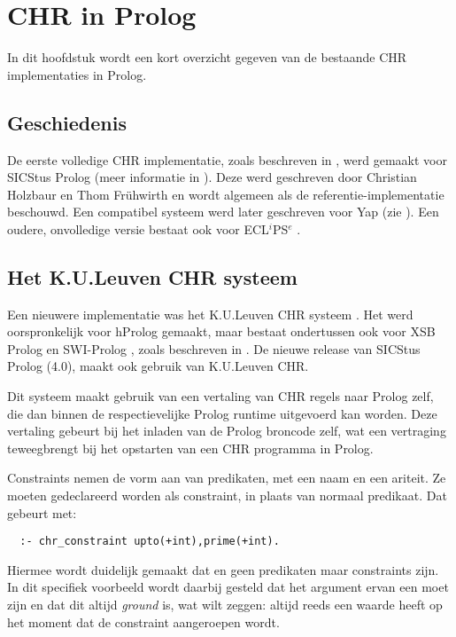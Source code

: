 \chapter{CHR in Prolog} \label{chap:chrprolog}

In dit hoofdstuk wordt een kort overzicht gegeven van de bestaande CHR implementaties in Prolog.

\section{Geschiedenis}

De eerste volledige CHR implementatie, zoals beschreven in \cite{christian:system}, werd gemaakt voor SICStus Prolog (meer informatie in \cite{sicstus}). Deze werd geschreven door Christian Holzbaur en Thom Fr\"uhwirth en wordt algemeen als de referentie-implementatie beschouwd. Een compatibel systeem werd later geschreven voor Yap (zie \cite{yap}). Een oudere, onvolledige versie bestaat ook voor ECL$^i$PS$^e$ \cite{eclipse}.

\section{Het K.U.Leuven CHR systeem}

Een nieuwere implementatie was het K.U.Leuven CHR systeem \cite{tom:kulchr}. Het werd oorspronkelijk voor hProlog gemaakt, maar bestaat ondertussen ook voor XSB Prolog \cite{xsb} en SWI-Prolog \cite{swiprolog}, zoals beschreven in \cite{tom:swi:wclp2005}. De nieuwe release van SICStus Prolog (4.0), maakt ook gebruik van K.U.Leuven CHR.

Dit systeem maakt gebruik van een vertaling van CHR regels naar Prolog zelf, die dan binnen de respectievelijke Prolog runtime uitgevoerd kan worden. Deze vertaling gebeurt bij het inladen van de Prolog broncode zelf, wat een vertraging teweegbrengt bij het opstarten van een CHR programma in Prolog.

Constraints nemen de vorm aan van predikaten, met een naam en een ariteit. Ze moeten gedeclareerd worden als constraint, in plaats van normaal predikaat. Dat gebeurt met: \begin{Verbatim}
  :- chr_constraint upto(+int),prime(+int).
\end{Verbatim}
Hiermee wordt duidelijk gemaakt dat  en  geen predikaten maar constraints zijn. In dit specifiek voorbeeld wordt daarbij gesteld dat het argument ervan een  moet zijn en dat dit altijd {\em ground} is, wat wilt zeggen: altijd reeds een waarde heeft op het moment dat de constraint aangeroepen wordt.

